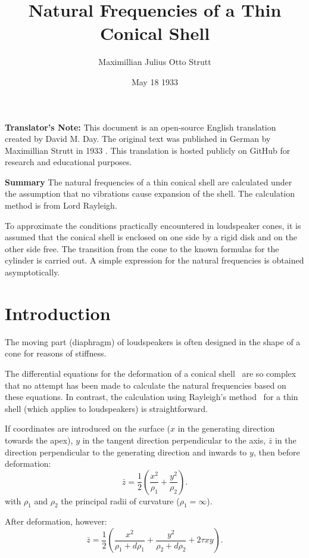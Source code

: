 \documentclass{amsart}
\title{Natural Frequencies of a Thin Conical Shell}
\author{Maximillian Julius Otto Strutt}
\date{May 18 1933}
\begin{document}
\maketitle

\noindent
\textbf{Translator's Note:} This document is an open-source English translation 
created by David M. Day. The original text was published in German by 
Maximillian Strutt in 1933 \autocite{Strutt1933}.
This translation is hosted publicly on GitHub for research and educational purposes.

\textbf{Summary}
The natural frequencies of a thin conical shell are calculated under the
assumption that no vibrations cause expansion of the shell.  The calculation
method is from Lord Rayleigh.~\autocite{Rayleigh1881}~\autocite[\S 235 f]{Rayleigh1887}

To approximate the
conditions practically encountered in loudspeaker cones, it is assumed that the
conical shell is enclosed on one side by a rigid disk and on the other side
free.  The transition from the cone to the known formulas for the cylinder is
carried out.  A simple expression for the natural frequencies is obtained asymptotically.

\setcounter{page}{729}

\section{Introduction}
The moving part (diaphragm) of loudspeakers is often designed in the shape of a
cone for reasons of stiffness.

The differential equations for the deformation of a conical
shell~\autocite[page~603]{Love1920} are so complex that no attempt has been
made to calculate the natural frequencies based on these equations.  In
contrast, the calculation using Rayleigh's method~\autocite{ScientificPapersVol1} for a
thin shell (which applies to loudspeakers) is straightforward.

If coordinates are introduced on the surface (\(x\) in
the generating direction towards the apex), \(y\) in the
tangent direction perpendicular to the axis, \(\bar{z}\)
in the direction perpendicular to the generating
direction and inwards to \(y\), then before deformation:
\[
\bar{z}= \frac{1}{2}
\left(\frac{x^2}{\rho_1} + \frac{y^2}{\rho_2} \right).
\]
with \(\rho_1\) and \(\rho_2\) the principal radii of
curvature (\(\rho_1 = \infty\)).

After deformation, however:
\[
\bar{z} = \frac{1}{2} \left(
\frac{x^2}{\rho_1 + d\rho_1} +
\frac{y^2}{\rho_2 + d\rho_2} + 2\tau x y
\right).
\]
\end{document}

